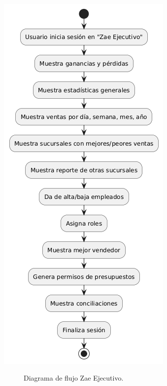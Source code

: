 \documentclass[protocolo.tex]{subfiles}
\begin{document}
\begin{center}
\includegraphics[scale=0.6]{Imagenes/Pdf/zaeejecutivoF.png}
\end{center}
\begin{figure}[h]  %
    \centering
    \caption{Diagrama de flujo Zae Ejecutivo.}
    \label{fig:mi-figura7}
\end{figure}
\end{document}
